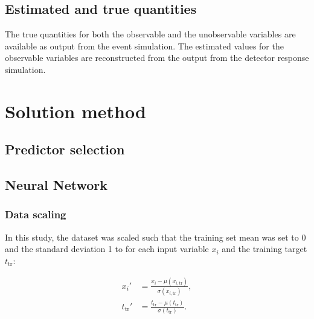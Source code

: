 \documentclass{scrartcl}
\begin{document}
\subsection{Estimated and true quantities}
The true quantities for both the observable and the unobservable variables are available as output from the event simulation. The estimated values for the observable variables are reconstructed from the output from the detector response simulation.

\section{Solution method}

\subsection{Predictor selection}

\subsection{Neural Network}

\subsubsection{Data scaling}

In this study, the dataset was scaled such that the training set mean was set to 0 and the standard deviation 1 to for each input variable $x_i$ and the training target $t_{\text{tr}}$:


\begin{align}
  \label{eq:nnxnorm}
  x_i' &= \frac{x_i - \mu(x_{i,\text{tr}})}{\sigma(x_{i,\text{tr}})},\\
  \label{eq:nntnorm}
  t_{\text{tr}}' &= \frac{t_{\text{tr}} - \mu(t_{\text{tr}})}{\sigma(t_{\text{tr}})}.
\end{align}
\end{document}
